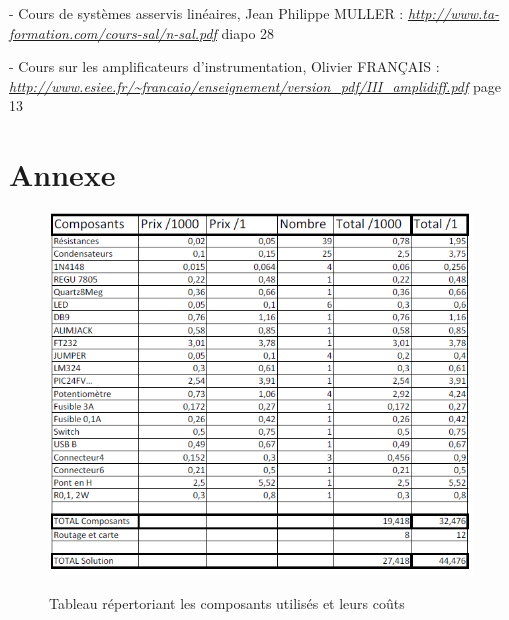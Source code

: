 \documentclass[11pt, french]{article} %
\begin{document}
- Cours de systèmes asservis linéaires, Jean Philippe MULLER : 
\newline \textit{\underline{\url{http://www.ta-formation.com/cours-sal/n-sal.pdf}}} diapo 28

- Cours sur les amplificateurs d'instrumentation, Olivier FRANÇAIS : 
\newline \textit{\underline{\url{http://www.esiee.fr/~francaio/enseignement/version_pdf/III_amplidiff.pdf}}} page 13


\pagebreak
\section{Annexe}
\medskip
\begin{figure}[!h]
	\centering
	\includegraphics[width=15cm]{SolutionAnalogique/cout.png}
	\label{cout}
	\caption{Tableau répertoriant les composants utilisés et leurs coûts}
\end{figure}
\end{document}
